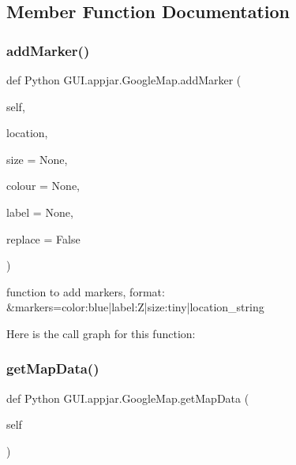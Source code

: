 \subsection{Member Function Documentation}
\mbox{\label{class_python_01_g_u_i_1_1appjar_1_1_google_map_a1d96cd8290a1082d0ada7811457def61}} 
\subsubsection{\texorpdfstring{add\+Marker()}{addMarker()}}
{\footnotesize\ttfamily def Python G\+U\+I.\+appjar.\+Google\+Map.\+add\+Marker (\begin{DoxyParamCaption}\item[{}]{self,  }\item[{}]{location,  }\item[{}]{size = {\ttfamily None},  }\item[{}]{colour = {\ttfamily None},  }\item[{}]{label = {\ttfamily None},  }\item[{}]{replace = {\ttfamily False} }\end{DoxyParamCaption})}

\begin{DoxyVerb}function to add markers, format:
    &markers=color:blue|label:Z|size:tiny|location_string
\end{DoxyVerb}
 Here is the call graph for this function\+:
\mbox{\label{class_python_01_g_u_i_1_1appjar_1_1_google_map_a994ebfd2df12c300c180775ad6fcd83c}} 
\subsubsection{\texorpdfstring{get\+Map\+Data()}{getMapData()}}
{\footnotesize\ttfamily def Python G\+U\+I.\+appjar.\+Google\+Map.\+get\+Map\+Data (\begin{DoxyParamCaption}\item[{}]{self }\end{DoxyParamCaption})}

